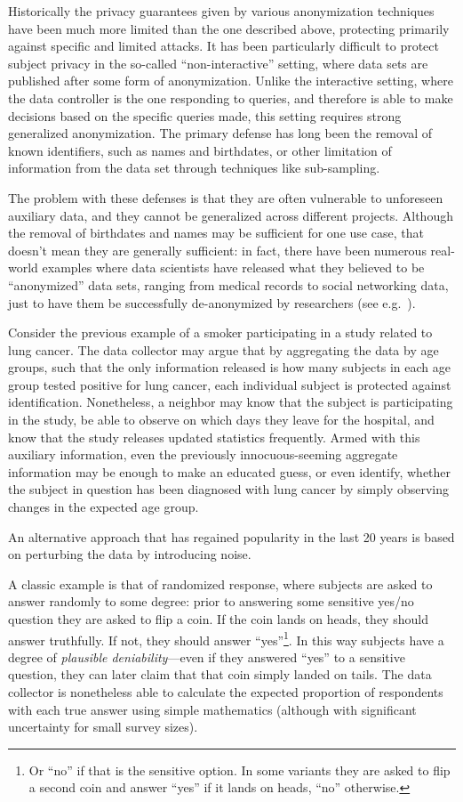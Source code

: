 \documentclass[a4paper,12pt]{article}
\begin{document}
Historically the privacy guarantees given by various anonymization techniques have been much more limited than the one described above, protecting primarily against specific and limited attacks. It has been particularly difficult to protect subject privacy in the so-called ``non-interactive'' setting, where data sets are published after some form of anonymization. Unlike the interactive setting, where the data controller is the one responding to queries, and therefore is able to make decisions based on the specific queries made, this setting requires strong generalized anonymization. The primary defense has long been the removal of known identifiers, such as names and birthdates, or other limitation of information from the data set through techniques like sub-sampling.

The problem with these defenses is that they are often vulnerable to unforeseen auxiliary data, and they cannot be generalized across different projects. Although the removal of birthdates and names may be sufficient for one use case, that doesn't mean they are generally sufficient: in fact, there have been numerous real-world examples where data scientists have released what they believed to be ``anonymized'' data sets, ranging from medical records to social networking data, just to have them be successfully de-anonymized by researchers (see e.g.\ \cite{reidentification2011}).

Consider the previous example of a smoker participating in a study related to lung cancer. The data collector may argue that by aggregating the data by age groups, such that the only information released is how many subjects in each age group tested positive for lung cancer, each individual subject is protected against identification. Nonetheless, a neighbor may know that the subject is participating in the study, be able to observe on which days they leave for the hospital, and know that the study releases updated statistics frequently. Armed with this auxiliary information, even the previously innocuous-seeming aggregate information may be enough to make an educated guess, or even identify, whether the subject in question has been diagnosed with lung cancer by simply observing changes in the expected age group.

An alternative approach that has regained popularity in the last 20 years is based on perturbing the data by introducing noise.

A classic example is that of randomized response, where subjects are asked to answer randomly to some degree: prior to answering some sensitive yes/no question they are asked to flip a coin. If the coin lands on heads, they should answer truthfully. If not, they should answer ``yes''\footnote{Or ``no'' if that is the sensitive option. In some variants they are asked to flip a second coin and answer ``yes'' if it lands on heads, ``no'' otherwise.}. In this way subjects have a degree of \emph{plausible deniability}---even if they answered ``yes'' to a sensitive question, they can later claim that that coin simply landed on tails. The data collector is nonetheless able to calculate the expected proportion of respondents with each true answer using simple mathematics (although with significant uncertainty for small survey sizes).
\end{document}
